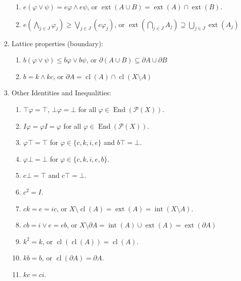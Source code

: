 \documentclass{treatise}
\begin{document}
\begin{proposition}
\begin{enumerate}
\begin{enumerate}
        \item $e(\varphi \vee \psi) = e\varphi \wedge e\psi$, or $\operatorname{ext}(A \cup B) = \operatorname{ext}(A) \cap \operatorname{ext}(B)$.
        \item $e \left( \bigwedge_{j \in J} \varphi_j \right) \geq \bigvee_{j \in J} (e \varphi_j)$, or $\operatorname{ext} \left( \bigcap_{j \in J} A_j \right) \supseteq \bigcup_{j \in J} \operatorname{ext}(A_j)$
    \end{enumerate}
    \item Lattice properties (boundary):
    \begin{enumerate}
        \item $b(\varphi \vee \psi) \leq b\varphi \vee b\psi$, or $\partial (A \cup B) \subseteq \partial A \cup \partial B$
        \item $b = k \wedge kc$, or $\partial A = \operatorname{cl}(A) \cap \operatorname{cl}(X \setminus A)$
    \end{enumerate}
    \item Other Identities and Inequalities:
    \begin{enumerate}
        \item $\top \varphi = \top$, $\bot \varphi = \bot$ for all $\varphi \in \operatorname{End}(\mathcal{P}(X))$.
        \item $I \varphi = \varphi I = \varphi$ for all $\varphi \in \operatorname{End}(\mathcal{P}(X))$.
        \item $\varphi \top = \top$ for $\varphi \in \{ c, k, i, e \}$ and $b \top = \bot$.
        \item $\varphi \bot = \bot$ for $\varphi \in \{ c, k, i, e, b \}$.
        \item $c \bot = \top$ and $c \top = \bot$.
        \\
        \item $c^2 = I$.
        \item $ck = e = ic$, or $X \setminus \operatorname{cl}(A) = \operatorname{ext}(A) = \operatorname{int}(X \setminus A)$.
        \item $cb = i \vee e = eb$, or $X \setminus \partial A = \operatorname{int}(A) \cup \operatorname{ext}(A) = \operatorname{ext}(\partial A)$
        \\
        \item $k^2 = k$, or $\operatorname{cl}(\operatorname{cl}(A)) = \operatorname{cl} (A)$.
        \item $kb = b$, or $\operatorname{cl}(\partial A) = \partial A$.
        \item $kc = ci$.

\end{enumerate}
\end{enumerate}
\end{proposition}
\end{document}
